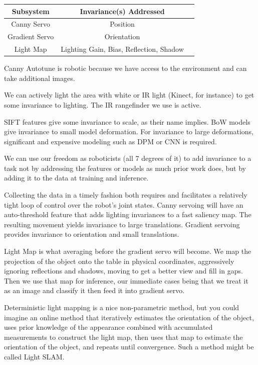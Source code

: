 \documentclass[graybox]{svmult}
\begin{document}
\begin{table}
\begin{tabular}{ccc}
\toprule
Subsystem      &  Invariance(s) Addressed\\
\midrule
Canny Servo    &  Position\\
Gradient Servo &  Orientation\\
Light Map      &  Lighting Gain, Bias, Reflection, Shadow\\
\bottomrule
\end{tabular}
\end{table}

Canny Autotune is robotic because we have access to the environment and can
take additional images.

We can actively light the area with white or IR light (Kinect, for instance) to
get some invariance to lighting. The IR rangefinder we use is active.

SIFT features give some invariance to scale, as their name implies. BoW models
give invariance to small model deformation. For invariance to large
deformations, significant and expensive modeling such as DPM or CNN is
required. 

We can use our freedom as roboticists (all 7 degrees of it) to add invariance
to a task not by addressing the features or models as much prior work does, but
by adding it to the data at training and inference. 

Collecting the data in a timely fashion both requires and facilitates a
relatively tight loop of control over the robot’s joint states. Canny servoing
will have an auto-threshold feature that adds lighting invariances to a fast
saliency map. The resulting movement yields invariance to large translations.
Gradient servoing provides invariance to orientation and small translations.

Light Map is what averaging before the gradient servo will become. We map the
projection of the object onto the table in physical coordinates, aggressively
ignoring reflections and shadows, moving to get a better view and fill in gaps.
Then we use that map for inference, our immediate cases being that we treat it
as an image and classify it then feed it into gradient servo. 

Deterministic light mapping is a nice non-parametric method, but you could
imagine an online method that iteratively estimates the orientation of the
object, uses prior knowledge of the appearance combined with accumulated
measurements to construct the light map, then uses that map to estimate the
orientation of the object, and repeats until convergence. Such a method might
be called Light SLAM.
\end{document}
